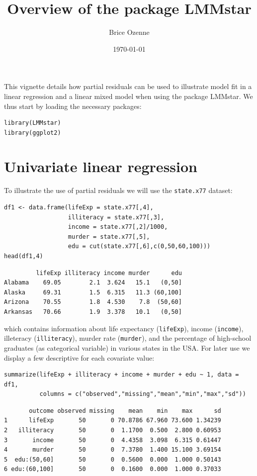 \documentclass[12pt]{article}
\author{Brice Ozenne}
\date{\today}
\title{Overview of the package LMMstar}
\begin{document}
\maketitle
This vignette details how partial residuals can be used to illustrate
model fit in a linear regression and a linear mixed model when using
the package LMMstar. We thus start by loading the necessary packages:
\lstset{language=r,label= ,caption= ,captionpos=b,numbers=none}
\begin{lstlisting}
library(LMMstar)
library(ggplot2)
\end{lstlisting}


\section{Univariate linear regression}
\label{sec:org6344a7c}

To illustrate the use of partial residuals we will use the \texttt{state.x77}
dataset:
\lstset{language=r,label= ,caption= ,captionpos=b,numbers=none}
\begin{lstlisting}
df1 <- data.frame(lifeExp = state.x77[,4],
                  illiteracy = state.x77[,3],
                  income = state.x77[,2]/1000,
                  murder = state.x77[,5],
                  edu = cut(state.x77[,6],c(0,50,60,100)))
head(df1,4)
\end{lstlisting}

\begin{verbatim}
         lifeExp illiteracy income murder      edu
Alabama    69.05        2.1  3.624   15.1   (0,50]
Alaska     69.31        1.5  6.315   11.3 (60,100]
Arizona    70.55        1.8  4.530    7.8  (50,60]
Arkansas   70.66        1.9  3.378   10.1   (0,50]
\end{verbatim}


 which contains information about life expectancy (\texttt{lifeExp}), income
(\texttt{income}), illeteracy (\texttt{illiteracy}), murder rate (\texttt{murder}), and the
percentage of high-school graduates (as categorical variable) in
various states in the USA. For later use we display a few descriptive
for each covariate value:
\lstset{language=r,label= ,caption= ,captionpos=b,numbers=none}
\begin{lstlisting}
summarize(lifeExp + illiteracy + income + murder + edu ~ 1, data = df1,
          columns = c("observed","missing","mean","min","max","sd"))
\end{lstlisting}

\begin{verbatim}
       outcome observed missing    mean    min    max      sd
1      lifeExp       50       0 70.8786 67.960 73.600 1.34239
2   illiteracy       50       0  1.1700  0.500  2.800 0.60953
3       income       50       0  4.4358  3.098  6.315 0.61447
4       murder       50       0  7.3780  1.400 15.100 3.69154
5  edu:(50,60]       50       0  0.5600  0.000  1.000 0.50143
6 edu:(60,100]       50       0  0.1600  0.000  1.000 0.37033
\end{verbatim}
\end{document}
